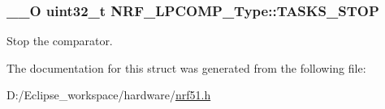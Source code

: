 \subsubsection[{T\+A\+S\+K\+S\+\_\+\+S\+T\+O\+P}]{\setlength{\rightskip}{0pt plus 5cm}\+\_\+\+\_\+\+O uint32\+\_\+t N\+R\+F\+\_\+\+L\+P\+C\+O\+M\+P\+\_\+\+Type\+::\+T\+A\+S\+K\+S\+\_\+\+S\+T\+O\+P}\label{struct_n_r_f___l_p_c_o_m_p___type_a777e434d87df28fc3b1b5483dafade02}
Stop the comparator. 

The documentation for this struct was generated from the following file\+:\begin{DoxyCompactItemize}
\item 
D\+:/\+Eclipse\+\_\+workspace/hardware/\hyperlink{nrf51_8h}{nrf51.\+h}\end{DoxyCompactItemize}

